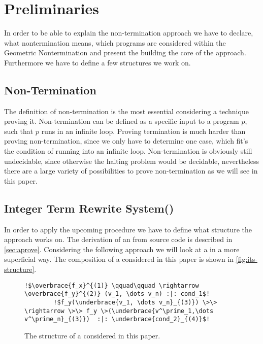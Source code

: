 \chapter{Preliminaries}
\label{chapter:preliminaries}

In order to be able to explain the non-termination approach we have to declare, what nontermination means, which programs are considered within the Geometric Nontermination and present the \gna building the core of the approach. Furthermore we have to define a few structures we work on.

\section{Non-Termination}
The definition of non-termination is the most essential considering a technique proving it. Non-termination can be defined as a specific input to a program $p$, such that $p$ runs in an infinite loop.
Proving termination is much harder than proving non-termination, since we only have to determine one case, which fit's the condition of running into an infinite loop. \newline
Non-termination is obviously still undecidable, since otherwise the halting problem would be decidable, nevertheless there are a large variety of possibilities to prove non-termination as we will see in this paper.

\section{Integer Term Rewrite System(\its)}
\label{sec:its}
In order to apply the upcoming procedure we have to define what structure the approach works on. The derivation of an \its from source code is described in \autoref{sec:aprove}. Considering the following approach we will look at a \its in a more superficial way. The composition of a \its considered in this paper is shown in \autoref{fig:its-structure}.\newline
\begin{figure}[H]
	\begin{lstlisting}[escapechar=!]
		!$\overbrace{f_x}^{(1)} \qquad\qquad \rightarrow \overbrace{f_y}^{(2)} (v_1, \dots v_n) :|: cond_1$!
		!$f_y(\underbrace{v_1, \dots v_n}_{(3)}) \>\> \rightarrow \>\> f_y \>(\underbrace{v^\prime_1,\dots v^\prime_n}_{(3)})  :|: \underbrace{cond_2}_{(4)}$!
	\end{lstlisting}
	\caption{The structure of a \its considered in this paper.}
	\label{fig:its-structure}
\end{figure}

